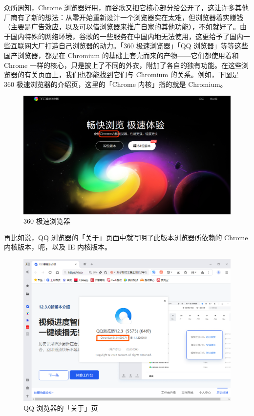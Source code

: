 众所周知，Chrome 浏览器好用，而谷歌又把它核心部分给公开了，这让许多其他厂商有了新的想法：从零开始重新设计一个浏览器实在太难，但浏览器着实赚钱（主要是广告效应，以及可以借浏览器来推广自家的其他功能），不如就好了。由于国内特殊的网络环境，谷歌的一些服务在中国内地无法使用，这更给予了国内一些互联网大厂打造自己浏览器的动力。「360 极速浏览器」「QQ 浏览器」等等这些国产浏览器，都是在 Chromium 的基础上套壳而来的产物——它们都使用着和 Chrome 一样的核心，只是披上了不同的外衣，附加了各自的独有功能。在这些浏览器的有关页面上，我们也都能找到它们与 Chromium 的关系。例如，下图是 360 极速浏览器的介绍页，这里的「Chrome 内核」指的就是 Chromium。

\begin{figure}[htb!]
  \centering
  \includegraphics[width=.9\textwidth]{assets/software/360_ee.png}
  \caption{360 极速浏览器}
  \label{fig:360_ee}
\end{figure}

再比如说，QQ 浏览器的「关于」页面中就写明了此版本浏览器所依赖的 Chrome 内核版本，呃，以及 IE 内核版本。

\begin{figure}[htb!]
  \centering
  \includegraphics[width=.6\textwidth]{assets/software/QQ_Browser.png}
  \caption{QQ 浏览器的「关于」页}
  \label{fig:QQ_Browser}
\end{figure}

